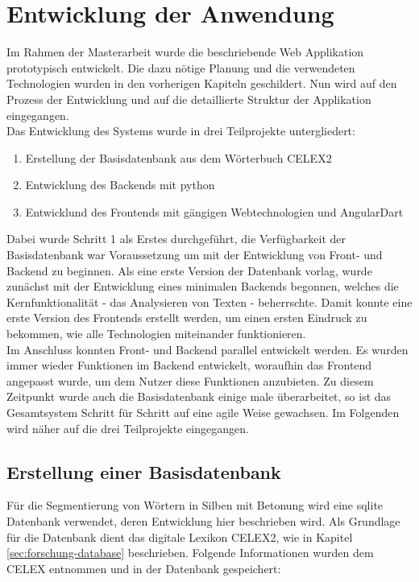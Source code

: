 
\chapter{Entwicklung der Anwendung}

Im Rahmen der Masterarbeit wurde die beschriebende Web Applikation prototypisch entwickelt. Die dazu nötige Planung und die verwendeten Technologien wurden in den vorherigen Kapiteln geschildert. Nun wird auf den Prozess der Entwicklung und auf die detaillierte Struktur der Applikation eingegangen.\\

Das Entwicklung des Systems wurde in drei Teilprojekte untergliedert:
\begin{enumerate}
	\item Erstellung der Basisdatenbank aus dem Wörterbuch CELEX2
	\item Entwicklung des Backends mit python
	\item Entwicklund des Frontends mit gängigen Webtechnologien und AngularDart
\end{enumerate}

Dabei wurde Schritt 1 als Erstes durchgeführt, die Verfügbarkeit der Basisdatenbank war Voraussetzung um mit der Entwicklung von Front- und Backend zu beginnen. Als eine erste Version der Datenbank vorlag, wurde zunächst mit der Entwicklung eines minimalen Backends begonnen, welches die Kernfunktionalität - das Analysieren von Texten - beherrschte. Damit konnte eine erste Version des Frontends erstellt werden, um einen ersten Eindruck zu bekommen, wie alle Technologien miteinander funktionieren.\\
Im Anschluss konnten Front- und Backend parallel entwickelt werden. Es wurden immer wieder Funktionen im Backend entwickelt, woraufhin das Frontend angepasst wurde, um dem Nutzer diese Funktionen anzubieten. Zu diesem Zeitpunkt wurde auch die Basisdatenbank einige male überarbeitet, so ist das Gesamtsystem Schritt für Schritt auf eine agile Weise  gewachsen. Im Folgenden wird näher auf die drei Teilprojekte eingegangen.

\section{Erstellung einer Basisdatenbank}
\label{sec:worddatabase}

Für die Segmentierung von Wörtern in Silben mit Betonung wird eine sqlite Datenbank verwendet, deren Entwicklung hier beschrieben wird. Als Grundlage für die Datenbank dient das digitale Lexikon  CELEX2, wie in Kapitel \ref{sec:forschung-database} beschrieben. Folgende Informationen wurden dem CELEX entnommen und in der Datenbank gespeichert:

